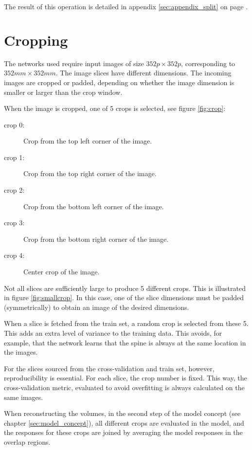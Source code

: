 The result of this operation is detailed in appendix \ref{sec:appendix_split} on page \pageref{sec:appendix_split}.

\section{Cropping\label{sec:cropping}}
The networks used require input images of size $352 p \times 352 p$, corresponding to $352 mm \times 352 mm$.
The image slices have different dimensions.
The incoming images are cropped or padded, depending on whether the image dimension is smaller or larger than the crop window.


When the image is cropped, one of 5 crops is selected, see figure \ref{fig:crop}:
\begin{description}
    \item[crop 0:] Crop from the top left corner of the image.
    \item[crop 1:] Crop from the top right corner of the image.
    \item[crop 2:] Crop from the bottom left corner of the image.
    \item[crop 3:] Crop from the bottom right corner of the image.
    \item[crop 4:] Center crop of the image.  
\end{description}

Not all slices are sufficiently large to produce 5 different crops. This is illustrated in figure \ref{fig:smallcrop}. In this case, one of the slice dimensions must be padded (symmetrically) to obtain an image of the desired dimensions.

When a slice is fetched from the train set, a random crop is selected from these 5.
This adds an extra level of variance to the training data. This avoids, for example, that the network learns that the spine is always at the same location in the images.

For the slices sourced from the cross-validation and train set, however, reproducibility is essential.
For each slice, the crop number is fixed.
This way, the cross-validation metric, evaluated to avoid overfitting is always calculated on the same images.

When reconstructing the volumes, in the second step of the model concept (see chapter \ref{sec:model_concept}), 
all different crops are evaluated in the model, and the responses for these crops are joined by averaging the model responses in the overlap regions.

